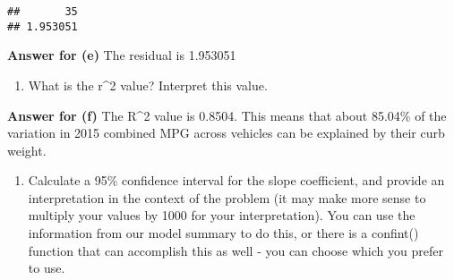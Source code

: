 \documentclass[
]{article}
\newenvironment{Shaded}{\begin{snugshade}}{\end{snugshade}}
\newcommand{\AttributeTok}[1]{\textcolor[rgb]{0.13,0.29,0.53}{#1}}
\newcommand{\CommentTok}[1]{\textcolor[rgb]{0.56,0.35,0.01}{\textit{#1}}}
\newcommand{\FloatTok}[1]{\textcolor[rgb]{0.00,0.00,0.81}{#1}}
\newcommand{\FunctionTok}[1]{\textcolor[rgb]{0.13,0.29,0.53}{\textbf{#1}}}
\newcommand{\NormalTok}[1]{#1}
\newcommand{\OtherTok}[1]{\textcolor[rgb]{0.56,0.35,0.01}{#1}}
\newcommand{\SpecialCharTok}[1]{\textcolor[rgb]{0.81,0.36,0.00}{\textbf{#1}}}
\newcommand{\StringTok}[1]{\textcolor[rgb]{0.31,0.60,0.02}{#1}}
\providecommand{\tightlist}{%
  \setlength{\itemsep}{0pt}\setlength{\parskip}{0pt}}
\begin{document}
\begin{Shaded}
\end{Shaded}

\begin{verbatim}
##       35 
## 1.953051
\end{verbatim}

\textbf{Answer for (e)} The residual is 1.953051

\begin{enumerate}
\def\labelenumi{(\alph{enumi})}
\setcounter{enumi}{5}
\tightlist
\item
  What is the r\^{}2 value? Interpret this value.
\end{enumerate}

\textbf{Answer for (f)} The R\^{}2 value is 0.8504. This means that
about 85.04\% of the variation in 2015 combined MPG across vehicles can
be explained by their curb weight.

\begin{enumerate}
\def\labelenumi{(\alph{enumi})}
\setcounter{enumi}{6}
\tightlist
\item
  Calculate a 95\% confidence interval for the slope coefficient, and
  provide an interpretation in the context of the problem (it may make
  more sense to multiply your values by 1000 for your interpretation).
  You can use the information from our model summary to do this, or
  there is a confint() function that can accomplish this as well - you
  can choose which you prefer to use.
\end{enumerate}
\end{document}
